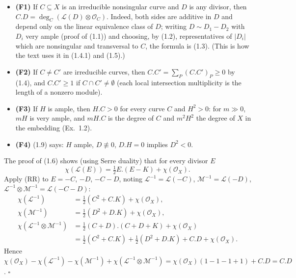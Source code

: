 \documentclass[11pt]{article}
\begin{document}
\begin{itemize}
\item \textbf{(F1)} If $C\subseteq X$ is an irreducible nonsingular curve and $D$ is any divisor, then $C.D=\deg_C(\mathcal L(D)\otimes\mathcal O_C)$. Indeed, both sides are additive in $D$ and depend only on the linear equivalence class of $D$; writing $D\sim D_1-D_2$ with $D_i$ very ample (proof of (1.1)) and choosing, by (1.2), representatives of $|D_i|$ which are nonsingular and transversal to $C$, the formula is (1.3). (This is how the text uses it in (1.4.1) and (1.5).)
\item \textbf{(F2)} If $C\ne C'$ are irreducible curves, then $C.C'=\sum_P (C.C')_P\ge 0$ by (1.4), and $C.C'\ge 1$ if $C\cap C'\neq\emptyset$ (each local intersection multiplicity is the length of a nonzero module).
\item \textbf{(F3)} If $H$ is ample, then $H.C>0$ for every curve $C$ and $H^2>0$: for $m\gg0$, $mH$ is very ample, and $mH.C$ is the degree of $C$ and $m^2H^2$ the degree of $X$ in the embedding (Ex.~1.2).
\item \textbf{(F4)} (1.9) says: $H$ ample, $D\not\equiv 0$, $D.H=0$ implies $D^2<0$.
\end{itemize}

\pf
The proof of (1.6) shows (using Serre duality) that for every divisor $E$
\[ \chi(\mathcal L(E))=\tfrac12 E.(E-K)+\chi(\mathcal O_X).\tag{RR} \]
Apply (RR) to $E=-C$, $-D$, $-C-D$, noting $\mathcal L^{-1}=\mathcal L(-C)$, $\mathcal M^{-1}=\mathcal L(-D)$, $\mathcal L^{-1}\otimes\mathcal M^{-1}=\mathcal L(-C-D)$:
\begin{align*}
\chi(\mathcal L^{-1})&=\tfrac12(C^2+C.K)+\chi(\mathcal O_X),\\
\chi(\mathcal M^{-1})&=\tfrac12(D^2+D.K)+\chi(\mathcal O_X),\\
\chi(\mathcal L^{-1}\otimes\mathcal M^{-1})&=\tfrac12(C+D).(C+D+K)+\chi(\mathcal O_X)\\
&=\tfrac12(C^2+C.K)+\tfrac12(D^2+D.K)+C.D+\chi(\mathcal O_X).
\end{align*}
Hence $\chi(\mathcal O_X)-\chi(\mathcal L^{-1})-\chi(\mathcal M^{-1})+\chi(\mathcal L^{-1}\otimes\mathcal M^{-1})=\chi(\mathcal O_X)(1-1-1+1)+C.D=C.D$. \hfill$\square$
\end{document}
